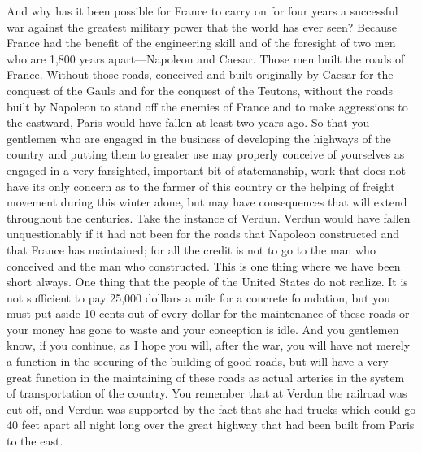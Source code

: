 \begin{linenumbers}
\indent And why has it been possible for France to carry on for four years a successful war against the greatest military power that the world has ever seen? Because France had the benefit of the engineering skill and of the foresight of two men who are 1,800 years apart—Napoleon and Caesar. Those men built the roads of France. Without those roads, conceived and built originally by Caesar for the conquest of the Gauls and for the conquest of the Teutons, without the roads built by Napoleon to stand off the enemies of France and to make aggressions to the eastward, Paris would have fallen at least two years ago. So that you gentlemen who are engaged in the business of developing the highways of the country and putting them to greater use may properly conceive of yourselves as engaged in a very farsighted, important bit of statemanship, work that does not have its only concern as to the farmer of this country or the helping of freight movement during this winter alone, but may have consequences that will extend throughout the centuries. Take the instance of Verdun. Verdun would have fallen unquestionably if it had not been for the roads that Napoleon constructed and that France has maintained; for all the credit is not to go to the man who conceived and the man who constructed. This is one thing where we have been short always. One thing that the people of the United States do not realize. It is not sufficient to pay 25,000 dolllars a mile for a concrete foundation, but you must put aside 10 cents out of every dollar for the maintenance of these roads or your money has gone to waste and your conception is idle. And you gentlemen know, if you continue, as I hope you will, after the war, you will have not merely a function in the securing of the building of good roads, but will have a very great function in the maintaining of these roads as actual arteries in the system of transportation of the country. You remember that at Verdun the railroad was cut off, and Verdun was supported by the fact that she had trucks which could go 40 feet apart all night long over the great highway that had been built from Paris to the east.


\end{linenumbers}
